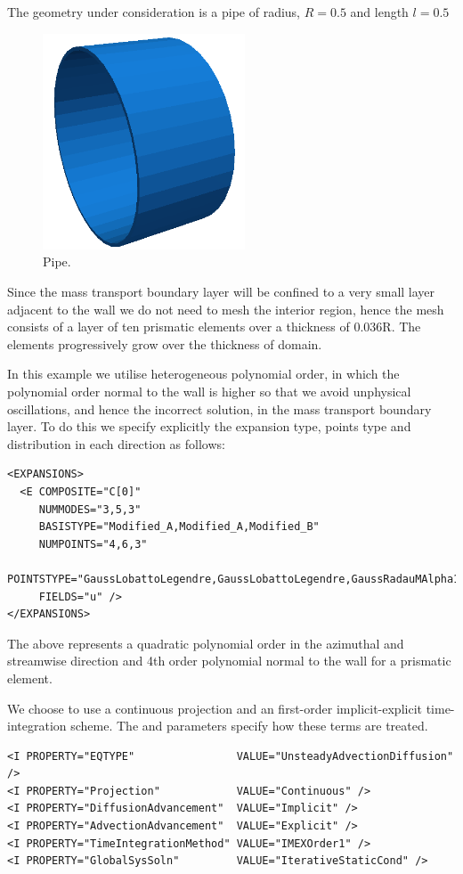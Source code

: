 The geometry under consideration is a pipe of radius, $R = 0.5$ and length $l =
0.5$

\begin{figure}[h!]
\begin{center}
\includegraphics[width=6cm]{img/pipe}
\caption{Pipe.}
\end{center}
\end{figure}

Since the mass transport boundary layer will be confined to a very small layer
adjacent to the wall we do not need to mesh the interior region, hence the mesh
consists of a layer of ten prismatic elements over a thickness of 0.036R. The
elements progressively grow over the thickness of domain.

In this example we utilise heterogeneous polynomial order, in which the
polynomial order normal to the wall is higher so that we avoid unphysical
oscillations, and hence the incorrect solution, in the mass transport boundary
layer. To do this we specify explicitly the expansion type, points type and
distribution in each direction as follows:
\begin{lstlisting}[style=XMLStyle]
<EXPANSIONS>
  <E COMPOSITE="C[0]"
     NUMMODES="3,5,3"
     BASISTYPE="Modified_A,Modified_A,Modified_B"
     NUMPOINTS="4,6,3"
     POINTSTYPE="GaussLobattoLegendre,GaussLobattoLegendre,GaussRadauMAlpha1Beta0"
     FIELDS="u" />
</EXPANSIONS>
\end{lstlisting}

The above represents a quadratic polynomial order in the azimuthal and
streamwise direction and 4th order polynomial normal to the wall for a prismatic
element.

We choose to use a continuous projection and an first-order implicit-explicit
time-integration scheme. The  and
 parameters specify how these terms are treated.
\begin{lstlisting}[style=XMLStyle]
<I PROPERTY="EQTYPE"                VALUE="UnsteadyAdvectionDiffusion" />
<I PROPERTY="Projection"            VALUE="Continuous" />
<I PROPERTY="DiffusionAdvancement"  VALUE="Implicit" />
<I PROPERTY="AdvectionAdvancement"  VALUE="Explicit" />
<I PROPERTY="TimeIntegrationMethod" VALUE="IMEXOrder1" />
<I PROPERTY="GlobalSysSoln"         VALUE="IterativeStaticCond" />
\end{lstlisting}

